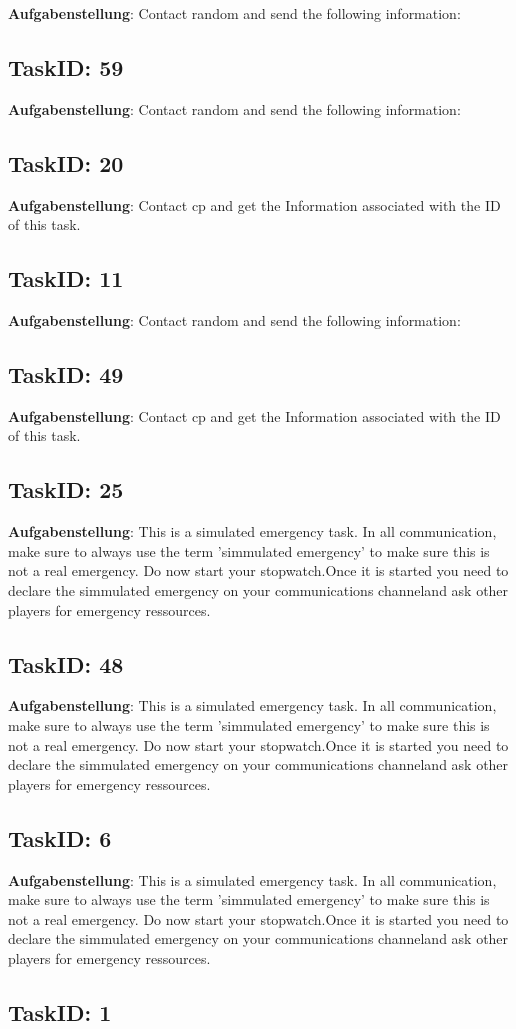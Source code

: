 \documentclass[12pt,a4paper]{scrreprt}
\begin{document}
\textbf{Aufgabenstellung}: Contact random and send the following information: \subsection{TaskID: 59}
\textbf{Aufgabenstellung}: Contact random and send the following information: \subsection{TaskID: 20}
\textbf{Aufgabenstellung}: Contact {cp} and get the Information associated with the ID of this task.\subsection{TaskID: 11}
\textbf{Aufgabenstellung}: Contact random and send the following information: \subsection{TaskID: 49}
\textbf{Aufgabenstellung}: Contact {cp} and get the Information associated with the ID of this task.\subsection{TaskID: 25}
\textbf{Aufgabenstellung}: This is a simulated emergency task. In all communication, make sure to always use the term 'simmulated emergency' to make sure this is not a real emergency. Do now start your stopwatch.Once it is started you need to declare the simmulated emergency on your communications channeland ask other players for emergency ressources.\subsection{TaskID: 48}
\textbf{Aufgabenstellung}: This is a simulated emergency task. In all communication, make sure to always use the term 'simmulated emergency' to make sure this is not a real emergency. Do now start your stopwatch.Once it is started you need to declare the simmulated emergency on your communications channeland ask other players for emergency ressources.\subsection{TaskID: 6}
\textbf{Aufgabenstellung}: This is a simulated emergency task. In all communication, make sure to always use the term 'simmulated emergency' to make sure this is not a real emergency. Do now start your stopwatch.Once it is started you need to declare the simmulated emergency on your communications channeland ask other players for emergency ressources.\subsection{TaskID: 1}
\end{document}
